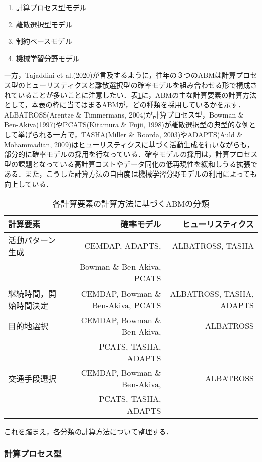 \begin{enumerate}
	\item 計算プロセス型モデル
	\item 離散選択型モデル
	\item 制約ベースモデル \\
	\item 機械学習分野モデル
\end{enumerate}

一方，Tajaddini et al.(2020)が言及するように，往年の３つのABMは計算プロセス型のヒューリスティクスと離散選択型の確率モデルを組み合わせる形で構成されていることが多いことに注意したい．表\ref{t2}に，ABMの主な計算要素の計算方法として，本表の枠に当てはまるABMが，どの種類を採用しているかを示す．ALBATROSS(Arentze \& Timmermans, 2004)が計算プロセス型，Bowman \& Ben-Akiva(1997)やPCATS(Kitamura \& Fujii, 1998)が離散選択型の典型的な例として挙げられる一方で，TASHA(Miller \& Roorda, 2003)やADAPTS(Auld \& Mohammadian, 2009)はヒューリスティクスに基づく活動生成を行いながらも，部分的に確率モデルの採用を行なっている．確率モデルの採用は，計算プロセス型の課題となっている高計算コストやデータ同化の低再現性を緩和しうる拡張である．また，こうした計算方法の自由度は機械学習分野モデルの利用によっても向上している．

\begin{table}[bp]
	\begin{center}
		\caption{各計算要素の計算方法に基づくABMの分類}
		\label{t2}
		\begin{tabular}{l|rr} 
			計算要素 & 確率モデル & ヒューリスティクス \\ \hline
			活動パターン生成 & CEMDAP, ADAPTS, & ALBATROSS, TASHA \\
			 & Bowman \& Ben-Akiva, PCATS & \\
			継続時間，開始時間決定 & CEMDAP, Bowman \& Ben-Akiva, PCATS & ALBATROSS, TASHA, ADAPTS \\
			目的地選択 & CEMDAP, Bowman \& Ben-Akiva,& ALBATROSS \\
			 &  PCATS, TASHA, ADAPTS & \\
			交通手段選択 & CEMDAP, Bowman \& Ben-Akiva, & ALBATROSS \\
			 & PCATS, TASHA, ADAPTS & \\ 
		\end{tabular}
	\end{center}
\end{table}

これを踏まえ，各分類の計算方法について整理する．

\subsubsection{計算プロセス型}

